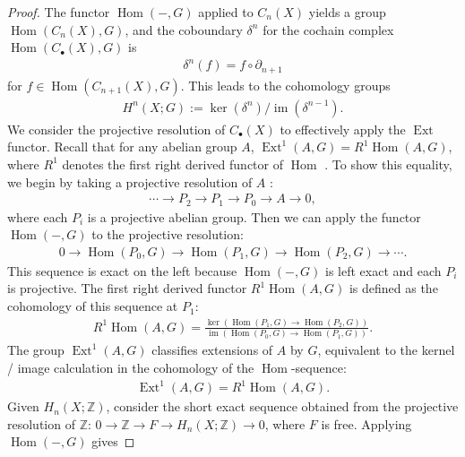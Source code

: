 \begin{proof}
The functor $\operatorname{Hom}(-, G)$ applied to $C_{n}(X)$ yields a group $\operatorname{Hom}(C_{n}(X), G)$, and the coboundary $\delta^{n}$ for the cochain complex $\operatorname{Hom}(C_{\bullet}(X), G)$ is 
\begin{align}
\delta^{n}(f) = f \circ \partial_{n+1}
\end{align}
for $f \in \operatorname{Hom}(C_{n+1}(X), G)$. This leads to the cohomology groups
\begin{align}
H^{n}(X; G) := \ker(\delta^{n}) / \operatorname{im}(\delta^{n-1}).
\end{align}
We consider the projective resolution of $C_{\bullet}(X)$ to effectively apply the $\operatorname{Ext}$ functor. Recall that for any abelian group $A$, $\operatorname{Ext}^{1}(A, G) = R^{1} \operatorname{Hom}(A, G)$, where $R^{1}$ denotes the first right derived functor of $\operatorname{Hom}$ \cite[\S 2.7]{Weibel1994}. To show this equality, we begin by taking a projective resolution of $A$ \cite[p.39f]{Weibel1994}:
\begin{align}
\cdots \to P_{2} \to P_{1} \to P_{0} \to A \to 0,
\end{align}
where each $P_{i}$ is a projective abelian group. Then we can apply the functor $\operatorname{Hom}(-, G)$ to the projective resolution:
\begin{align}
0 \to \operatorname{Hom}(P_{0}, G) \to \operatorname{Hom}(P_{1}, G) \to \operatorname{Hom}(P_{2}, G) \to \cdots.
\end{align}
This sequence is exact on the left because $\operatorname{Hom}(-, G)$ is left exact and each $P_{i}$ is projective. The first right derived functor $R^{1}\operatorname{Hom}(A, G)$ is defined as the cohomology of this sequence at $P_{1}$:
\begin{align}
R^{1} \operatorname{Hom}(A, G) = \frac{\ker(\operatorname{Hom}(P_{1}, G) \to \operatorname{Hom}(P_{2}, G))}{\operatorname{im}(\operatorname{Hom}(P_{0}, G) \to \operatorname{Hom}(P_{1}, G))}.
\end{align}
The group $\operatorname{Ext}^{1}(A, G)$ classifies extensions of $A$ by $G$, equivalent to the kernel / image calculation in the cohomology of the $\operatorname{Hom}$-sequence:
\begin{align}
\operatorname{Ext}^{1}(A, G) = R^{1} \operatorname{Hom}(A, G).
\end{align}
Given $H_{n}(X; \mathbb{Z})$, consider the short exact sequence obtained from the projective resolution of $\mathbb{Z}$: $0 \rightarrow \mathbb{Z} \rightarrow F \rightarrow H_{n}(X; \mathbb{Z}) \rightarrow 0$, where $F$ is free. Applying $\operatorname{Hom}(-, G)$ gives

\end{proof}
